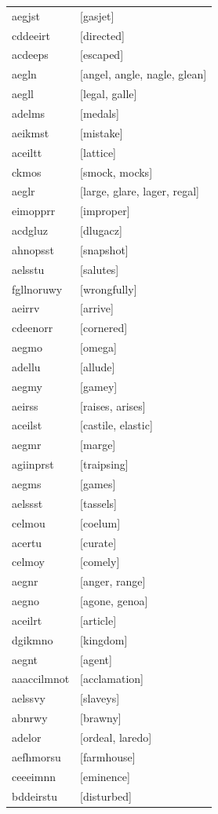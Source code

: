 \documentclass{article}
\begin{document}
\begin{tabular}{ll}
aegjst & [gasjet] \\
cddeeirt & [directed] \\
acdeeps & [escaped] \\
aegln & [angel, angle, nagle, glean] \\
aegll & [legal, galle] \\
adelms & [medals] \\
aeikmst & [mistake] \\
aceiltt & [lattice] \\
ckmos & [smock, mocks] \\
aeglr & [large, glare, lager, regal] \\
eimopprr & [improper] \\
acdgluz & [dlugacz] \\
ahnopsst & [snapshot] \\
aelsstu & [salutes] \\
fgllnoruwy & [wrongfully] \\
aeirrv & [arrive] \\
cdeenorr & [cornered] \\
aegmo & [omega] \\
adellu & [allude] \\
aegmy & [gamey] \\
aeirss & [raises, arises] \\
aceilst & [castile, elastic] \\
aegmr & [marge] \\
agiinprst & [traipsing] \\
aegms & [games] \\
aelssst & [tassels] \\
celmou & [coelum] \\
acertu & [curate] \\
celmoy & [comely] \\
aegnr & [anger, range] \\
aegno & [agone, genoa] \\
aceilrt & [article] \\
dgikmno & [kingdom] \\
aegnt & [agent] \\
aaaccilmnot & [acclamation] \\
aelssvy & [slaveys] \\
abnrwy & [brawny] \\
adelor & [ordeal, laredo] \\
aefhmorsu & [farmhouse] \\
ceeeimnn & [eminence] \\
bddeirstu & [disturbed] \\

\end{tabular}
\end{document}

